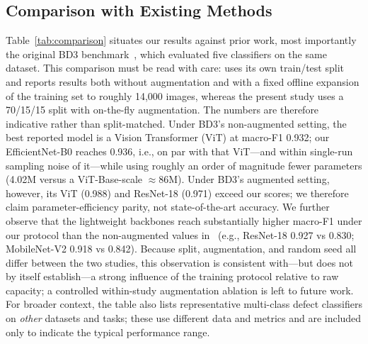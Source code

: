 \documentclass[ASNA, twocolumn]{USG}
\begin{document}
\subsection{Comparison with Existing Methods}
\label{sec:comparison}
Table~\ref{tab:comparison} situates our results against prior work, most importantly the original BD3 benchmark~\cite{ref40}, which evaluated five classifiers on the same dataset. This comparison must be read with care: \cite{ref40} uses its own train/test split and reports results both without augmentation and with a fixed offline expansion of the training set to roughly 14{,}000 images, whereas the present study uses a 70/15/15 split with on-the-fly augmentation. The numbers are therefore indicative rather than split-matched. Under BD3's non-augmented setting, the best reported model is a Vision Transformer (ViT) at macro-F1 0.932; our EfficientNet-B0 reaches 0.936, i.e., on par with that ViT---and within single-run sampling noise of it---while using roughly an order of magnitude fewer parameters (4.02M versus a ViT-Base-scale $\approx$86M). Under BD3's augmented setting, however, its ViT (0.988) and ResNet-18 (0.971) exceed our scores; we therefore claim parameter-efficiency parity, not state-of-the-art accuracy. We further observe that the lightweight backbones reach substantially higher macro-F1 under our protocol than the non-augmented values in~\cite{ref40} (e.g., ResNet-18 0.927 vs 0.830; MobileNet-V2 0.918 vs 0.842). Because split, augmentation, and random seed all differ between the two studies, this observation is consistent with---but does not by itself establish---a strong influence of the training protocol relative to raw capacity; a controlled within-study augmentation ablation is left to future work. For broader context, the table also lists representative multi-class defect classifiers on \emph{other} datasets and tasks; these use different data and metrics and are included only to indicate the typical performance range.
\end{document}

